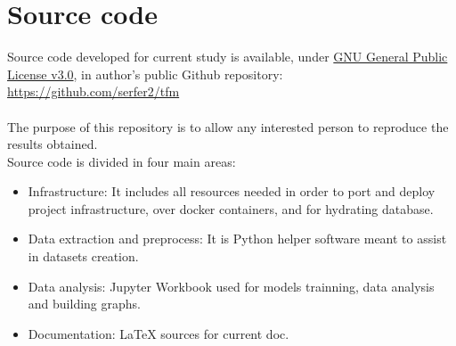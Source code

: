 \chapter{Source code}
\label{chapter:source}

Source code developed for current study is available, under \href{https://www.gnu.org/licenses/gpl-3.0.html}{GNU General Public License v3.0}, in author's public Github repository:\\
\href{https://github.com/serfer2/tfm}{https://github.com/serfer2/tfm}
\\
\\
The purpose of this repository is to allow any interested person to reproduce the results obtained.\\
Source code is divided in four main areas:

\begin{itemize}
    \item Infrastructure: It includes all resources needed in order to port and deploy project infrastructure, over docker containers, and for hydrating database.
    \item Data extraction and preprocess: It is Python helper software meant to assist in datasets creation.
    \item Data analysis: Jupyter Workbook used for models trainning, data analysis and building graphs.
    \item Documentation: LaTeX sources for current doc.
\end{itemize}


